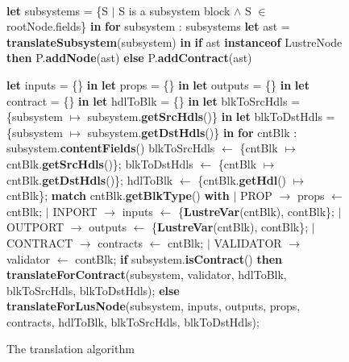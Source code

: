 \documentclass{article}
\begin{document}
\begin{figure}
\begin{algorithmic}
\\
\State \textbf{let} subsystems = \{S $\mid$ S is a subsystem block $\land$ S $\in$ rootNode.fields\} \textbf{in}
\State \textbf{for} subsystem : subsystems
\State {\ \ \ \ } \textbf{let} ast = \textbf{translateSubsystem}(subsystem) \textbf{in}
\State {\ \ \ \ } \textbf{if}  ast \textbf{instanceof} LustreNode \textbf{then}
\State {\ \ \ \ \ \ \ \ } P.\textbf{addNode}(ast)
\State {\ \ \ \ } \textbf{else}
\State {\ \ \ \ \ \ \ \ } P.\textbf{addContract}(ast)
\EndFunction
\label{mainalgo}
\end{algorithmic}

\begin{algorithmic}

\State \textbf{let} inputs = \{\} \textbf{in}
\State \textbf{let} props = \{\} \textbf{in}
\State \textbf{let} outputs = \{\} \textbf{in}
\State \textbf{let} contract = \{\} \textbf{in}
\State \textbf{let} hdlToBlk = \{\} \textbf{in}
\State \textbf{let} blkToSrcHdls = \{subsystem $\mapsto$ subsystem.\textbf{getSrcHdls}()\} \textbf{in}
\State \textbf{let} blkToDstHdls = \{subsystem $\mapsto$ subsystem.\textbf{getDstHdls}()\} \textbf{in}
\State \textbf{for} cntBlk : subsystem.\textbf{contentFields}()
\State {\ \ \ \ }  blkToSrcHdls $\leftarrow$ \{cntBlk $\mapsto$ cntBlk.\textbf{getSrcHdls}()\};
\State {\ \ \ \ }  blkToDstHdls $\leftarrow$ \{cntBlk $\mapsto$ cntBlk.\textbf{getDstHdls}()\};
\State {\ \ \ \ } hdlToBlk $\leftarrow$ \{cntBlk.\textbf{getHdl}() $\mapsto$ cntBlk\};
\State {\ \ \ \ } \textbf{match}  cntBlk.\textbf{getBlkType}() \textbf{with}
\State {\ \ \ \ } $\mid$ PROP $\rightarrow$ props $\leftarrow$ cntBlk;
\State {\ \ \ \ } $\mid$ INPORT $\rightarrow$ inputs $\leftarrow$ \{\textbf{LustreVar}(cntBlk), contBlk\}; 
\State {\ \ \ \ } $\mid$ OUTPORT $\rightarrow$ outputs $\leftarrow$ \{\textbf{LustreVar}(cntBlk), contBlk\};
\State {\ \ \ \ } $\mid$ CONTRACT $\rightarrow$ contracts $\leftarrow$ cntBlk;
\State {\ \ \ \ } $\mid$ VALIDATOR $\rightarrow$ validator $\leftarrow$ contBlk;
\State \textbf{if} subsystem.\textbf{isContract}() \textbf{then}
\State {\ \ \ \ } \textbf{translateForContract}(subsystem, validator, hdlToBlk, blkToSrcHdls, blkToDstHdls);
\State \textbf{else}
\State {\ \ \ \ } \textbf{translateForLusNode}(subsystem, inputs, outputs, props, contracts, hdlToBlk,
\State {\ \ \ \ \ \ \ \ \ \ \ \ \ \ \ \ \ \ \ \ \ \ \ \ \ \ \ \ \ \ \ \ \ \ \ \ } blkToSrcHdls, blkToDstHdls);
\EndFunction
\end{algorithmic}
\label{mainalgo1}
\caption{The translation algorithm}
\end{figure}
\end{document}
